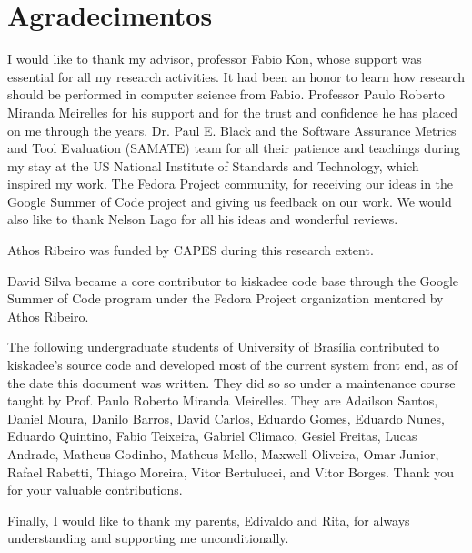 \chapter*{Agradecimentos}

I would like to thank my advisor, professor Fabio Kon, whose support was
essential for all my research activities. It had been an honor to learn how
research should be performed in computer science from Fabio.  Professor Paulo
Roberto Miranda Meirelles for his support and for the trust and confidence he
has placed on me through the years. Dr. Paul E. Black and the Software
Assurance Metrics and Tool Evaluation (SAMATE) team for all their patience and
teachings during my stay at the US National Institute of Standards and
Technology, which inspired my work. The Fedora Project community, for receiving
our ideas in the Google Summer of Code project and giving us feedback on our
work. We would also like to thank Nelson Lago for all his ideas and wonderful
reviews.

Athos Ribeiro was funded by CAPES during this research extent.

David Silva became a core contributor to kiskadee code base through the Google
Summer of Code program under the Fedora Project organization mentored by Athos
Ribeiro.

The following undergraduate students of University of Brasília contributed to
kiskadee's source code and developed most of the current system front end, as of
the date this document was written. They did so so under a maintenance course
taught by Prof. Paulo Roberto Miranda Meirelles.
They are Adailson Santos,
Daniel Moura,
Danilo Barros,
David Carlos,
Eduardo Gomes,
Eduardo Nunes,
Eduardo Quintino,
Fabio Teixeira,
Gabriel Climaco,
Gesiel Freitas,
Lucas Andrade,
Matheus Godinho,
Matheus Mello,
Maxwell Oliveira,
Omar Junior,
Rafael Rabetti,
Thiago Moreira,
Vitor Bertulucci, and
Vitor Borges.
Thank you for your valuable contributions.

Finally, I would like to thank my parents, Edivaldo and Rita, for always
understanding and supporting me unconditionally.

